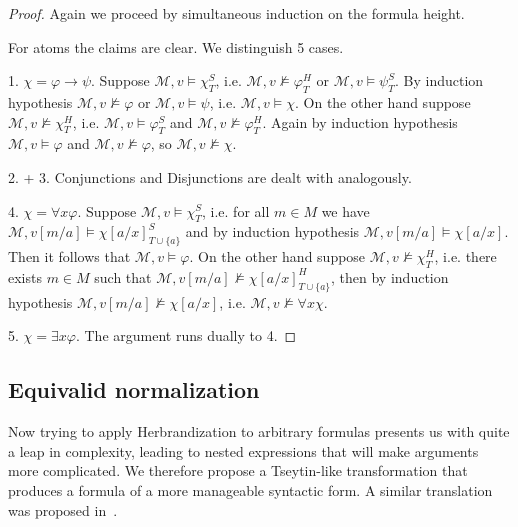 \documentclass[a4paper,12pt]{report}
\theoremstyle{definition}
\theoremstyle{definition}
\theoremstyle{definition}
\theoremstyle{definition}
\theoremstyle{definition}
\theoremstyle{definition}
\theoremstyle{definition}
\begin{document}
	\begin{proof}
		Again we proceed by simultaneous induction on the formula height.
		
		For atoms the claims are clear. We distinguish 5 cases.
		
		1. $\chi = \varphi\to\psi$. Suppose $\mathcal M, v\models\chi^S_T$, i.e. $\mathcal M, v\not\models\varphi^H_T$ or $\mathcal M, v\models\psi^S_T$. By induction hypothesis $\mathcal M, v\not\models \varphi$ or $\mathcal M, v\models\psi$, i.e. $\mathcal M, v\models \chi$. On the other hand suppose $\mathcal M, v\not\models\chi^H_T$, i.e. $\mathcal M, v\models\varphi^S_T$ and $\mathcal M, v\not\models\varphi^H_T$. Again by induction hypothesis $\mathcal M,v\models\varphi$ and $\mathcal M, v\not\models \varphi$, so $\mathcal M, v\not\models\chi$.
		
		2. + 3. Conjunctions and Disjunctions are dealt with analogously.
		
		4. $\chi = \forall x\varphi$.  Suppose $\mathcal M, v\models\chi^S_T$, i.e. for all $m\in M$ we have $\mathcal M, v[m/a]\models \chi[a/x]^S_{T\cup\{a\}}$ and by induction hypothesis $\mathcal M, v[m/a]\models \chi[a/x]$. Then it follows that $\mathcal M, v\models\varphi$. On the other hand suppose $\mathcal M, v\not\models\chi^H_T$, i.e. there exists $m\in M$ such that $\mathcal M, v[m/a]\not\models\chi[a/x]^H_{T\cup \{a\}}$, then by induction hypothesis $\mathcal M, v[m/a]\not\models \chi[a/x]$, i.e. $\mathcal M, v\not\models\forall x\chi$.
		
		5. $\chi = \exists x\varphi$.  The argument runs dually to 4.
	\end{proof}
	


	\subsection{Equivalid normalization}
	
	Now trying to apply Herbrandization to arbitrary formulas presents us with quite a leap in complexity, leading to nested expressions that will make arguments more complicated. We therefore propose a Tseytin-like transformation that produces a formula of a more manageable syntactic form. A similar translation was proposed in~\cite{statman1979intuitionistic}.
	
\end{document}
